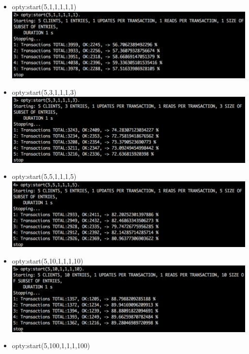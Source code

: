 \documentclass[a4paper, 11pt]{article}
\begin{document}
\begin{itemize}
\item opty:start(5,1,1,1,1,1)\\
\includegraphics[scale=0.5]{images/exp-ii-1.png} \\
\item opty:start(5,3,1,1,1,3)\\
\includegraphics[scale=0.5]{images/exp-ii-2.png} \\
\item opty:start(5,5,1,1,1,5)\\
\includegraphics[scale=0.5]{images/exp-ii-3.png} \\
\item opty:start(5,10,1,1,1,10)\\
\includegraphics[scale=0.5]{images/exp-ii-4.png} \\
\item opty:start(5,100,1,1,1,100)\\

\end{itemize}
\end{document}
